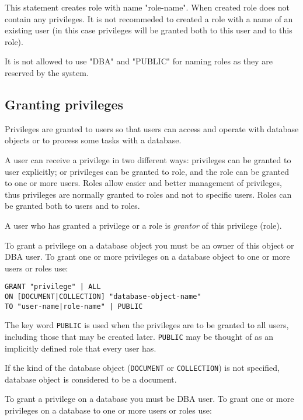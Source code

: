 \documentclass[a4paper,12pt]{article}
\begin{document}
This statement creates role with name "role-name". When created role does not contain any privileges. It is not recommeded to created a role with a name of an existing user (in this case privileges will be granted both to this user and to this role).

It is not allowed to use "DBA" and "PUBLIC" for naming roles as they are reserved by the system.

\subsection{Granting privileges}

Privileges are granted to users so that users can access and operate with database objects or to process some tasks with a database.

A user can receive a privilege in two different ways: privileges can be granted to user explicitly; or privileges can be granted to role, and the role can be granted to one or more users. Roles allow easier and better management of privileges, thus privileges are normally granted to roles and not to specific users. Roles can be granted both to users and to roles.

A user who has granted a privilege or a role is \emph{grantor} of this privilege (role).

To grant a privilege on a database object you must be an owner of this object or DBA user. To grant one or more privileges on a database object to one or more users or roles use:


\begin{verbatim}
GRANT "privilege" | ALL
ON [DOCUMENT|COLLECTION] "database-object-name"
TO "user-name|role-name" | PUBLIC
\end{verbatim}

The key word \verb!PUBLIC! is used when the privileges are to be granted to all users, including those that may be created later. \verb!PUBLIC! may be thought of as an implicitly defined role that every user has.

If the kind of the database object (\verb!DOCUMENT! or \verb!COLLECTION!) is not specified, database object is considered to be a document.

To grant a privilege on a database you must be DBA user. To grant one or more privileges on a database to one or more users or roles use:
\end{document}
